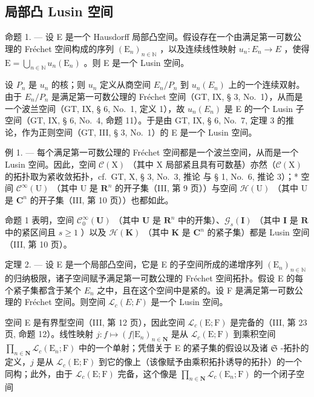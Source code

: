 \subsection{局部凸 Lusin 空间}

命题 1. --- 设 E 是一个 Hausdorff 局部凸空间。假设存在一个由满足第一可数公理的 Fréchet 空间构成的序列 \((\mathrm{E}_{n})_{n\in\mathbb{N}}\) ，以及连续线性映射 \(u_{n}:E_{n}\to E\) ，使得 \(\mathrm{E}=\bigcup_{n\in\mathbb{N}}u_{n}(\mathrm{E}_{n})\) 。则 E 是一个 Lusin 空间。

设 \(P_n\) 是 \(u_n\) 的核；则 \(u_n\) 定义从商空间 \(E_n / P_n\) 到 \(u_n(E_n)\) 上的一个连续双射。由于 \(E_n / P_n\) 是满足第一可数公理的 Fréchet 空间（GT, IX, § 3, No.~1），从而是一个波兰空间（GT, IX, § 6, No.~1, 定义 1），故 \(u_n(E_n)\) 是 E 的一个 Lusin 子空间（GT, IX, § 6, No.~4, 命题 11）。于是由 GT, IX, § 6, No.~7, 定理 3 的推论，作为正则空间（GT, III, § 3, No.~1）的 E 是一个 Lusin 空间。

例 1. --- 每个满足第一可数公理的 Fréchet 空间都是一个波兰空间，从而是一个 Lusin 空间。因此，空间 \(\mathcal{C}(\mathrm{X})\) （其中 \(\mathrm{X}\) 局部紧且具有可数基）亦然（\(\mathcal{C}(\mathrm{X})\) 的拓扑取为紧收敛拓扑，cf.~GT, X, § 3, No.~3, 推论 与 § 1, No.~6, 推论 3）；* 空间 \(\mathcal{C}^{\infty}(\mathrm{U})\) （其中 U 是 \(\mathbf{R}^{n}\) 的开子集（III, 第 9 页））与空间 \(\mathcal{H}(\mathrm{U})\) （其中 U 是 \(\mathbf{C}^{n}\) 的开子集（III, 第 10 页））也都如此。

命题 1 表明，空间 \(\mathcal{C}_0^\infty (\mathbf{U})\) （其中 \(\mathbf{U}\) 是 \(\mathbf{R}^n\) 中的开集）、\(\mathcal{G}_s(\mathbf{I})\) （其中 \(\mathbf{I}\) 是 \(\mathbf{R}\) 中的紧区间且 \(s\geqslant 1\) ）以及 \(\mathcal{H}(\mathbf{K})\) （其中 \(\mathbf{K}\) 是 \(\mathbf{C}^n\) 的紧子集）都是 Lusin 空间（III, 第 10 页）。

定理 2. --- 设 E 是一个局部凸空间，它是 E 的子空间所成的递增序列 \((\mathrm{E}_n)_{n\in \mathbb{N}}\) 的归纳极限，诸子空间赋予满足第一可数公理的 Fréchet 空间拓扑。假设 E 的每个紧子集都含于某个 \(E_{n}\) 之中，且在这个空间中是紧的。设 F 是满足第一可数公理的 Fréchet 空间。则空间 \(\mathcal{L}_{c}(E;F)\) 是一个 Lusin 空间。

空间 E 是有界型空间（III, 第 12 页），因此空间 \(\mathcal{L}_c(\mathrm{E};\mathrm{F})\) 是完备的（III, 第 23 页, 命题 12）。线性映射 \(j\colon f\mapsto (f|\mathrm{E}_n)_{n\in \mathbf{N}}\) 是从 \(\mathcal{L}_c(\mathrm{E};\mathrm{F})\) 到乘积空间 \(\prod_{n\in \mathbf{N}}\mathcal{L}_c(\mathrm{E}_n;\mathrm{F})\) 中的一个单射；凭借关于 E 的紧子集的假设以及诸 \(\mathfrak{S}\) -拓扑的定义，\(j\) 是从 \(\mathcal{L}_c(\mathrm{E};\mathrm{F})\) 到它的像上（该像赋予由乘积拓扑诱导的拓扑）的一个同构；此外，由于 \(\mathcal{L}_c(\mathrm{E};\mathrm{F})\) 完备，这个像是 \(\prod_{n\in \mathbf{N}}\mathcal{L}_c(\mathrm{E}_n;\mathrm{F})\) 的一个闭子空间

